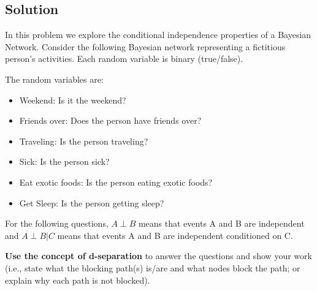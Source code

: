 \documentclass[submit]{harvardml}
\newcommand{\attr}[1]{\textsf{#1}}
\begin{document}
\subsection*{Solution}

\newpage

\begin{problem}

  \noindent In this problem we explore the conditional independence
  properties of a Bayesian Network.  Consider the following Bayesian
  network representing a fictitious person's activities. Each random
  variable is binary (true/false).

\begin{center}
\end{center}

The random variables are:

\begin{itemize}
\item \attr{Weekend}: Is it the weekend?
\item \attr{Friends over}: Does the person have friends over?
\item \attr{Traveling}: Is the person traveling?
\item \attr{Sick}: Is the person sick?
\item \attr{Eat exotic foods}: Is the person eating exotic foods?
\item \attr{Get Sleep}: Is the person getting sleep?
\end{itemize}

\medskip

For the following questions, $A \perp B$ means that events A and B are
independent and $A \perp B | C$ means that events A and B are independent
conditioned on C.

\textbf{Use the concept of d-separation} to answer the
questions and show your work (i.e., state what the blocking path(s) is/are and what nodes block the path; or explain why each path is not blocked).


\end{problem}
\end{document}
